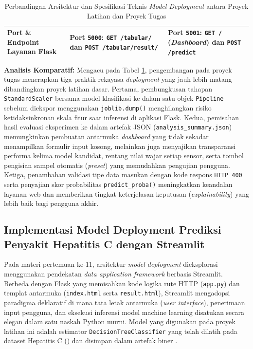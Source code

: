 \documentclass[a4paper,oneside,11pt]{book}
\begin{document}
\begin{table}[H]
{\begin{tabular}{|l|p{6.2cm}|p{6.5cm}|}
      Port \& Endpoint Layanan Flask & Port \texttt{5000}: \texttt{GET /tabular/} dan \texttt{POST /tabular/result/} & Port \texttt{5001}: \texttt{GET /} (\textit{Dashboard}) dan \texttt{POST /predict} \\ \hline
    \end{tabular}%
  }
  \caption{Perbandingan Arsitektur dan Spesifikasi Teknis \textit{Model Deployment} antara Proyek Latihan dan Proyek Tugas}
  \label{tab:komparasi-deployment}
\end{table}

\par \textbf{Analisis Komparatif:} Mengacu pada Tabel \ref{tab:komparasi-deployment}, pengembangan pada proyek tugas menerapkan tiga praktik rekayasa \textit{deployment} yang jauh lebih matang dibandingkan proyek latihan dasar. Pertama, pembungkusan tahapan \texttt{StandardScaler} bersama model klasifikasi ke dalam satu objek \texttt{Pipeline} sebelum diekspor menggunakan \texttt{joblib.dump()} menghilangkan risiko ketidaksinkronan skala fitur saat inferensi di aplikasi Flask. Kedua, pemisahan hasil evaluasi eksperimen ke dalam artefak JSON (\texttt{analysis\_summary.json}) memungkinkan pembuatan antarmuka \textit{dashboard} yang tidak sekadar menampilkan formulir input kosong, melainkan juga menyajikan transparansi performa kelima model kandidat, rentang nilai wajar setiap sensor, serta tombol pengisian sampel otomatis (\textit{preset}) yang memudahkan pengujian pengguna. Ketiga, penambahan validasi tipe data masukan dengan kode respons \texttt{HTTP 400} serta penyajian skor probabilitas \texttt{predict\_proba()} meningkatkan keandalan layanan web dan memberikan tingkat keterjelasan keputusan (\textit{explainability}) yang lebih baik bagi pengguna akhir.

\subsection{Implementasi Model Deployment Prediksi Penyakit Hepatitis C dengan Streamlit}

\par Pada materi pertemuan ke-11, arsitektur \textit{model deployment} dieksplorasi menggunakan pendekatan \textit{data application framework} berbasis Streamlit. Berbeda dengan Flask yang memisahkan kode logika rute HTTP (\texttt{app.py}) dan templat antarmuka (\texttt{index.html} serta \texttt{result.html}), Streamlit mengadopsi paradigma deklaratif di mana tata letak antarmuka (\textit{user interface}), penerimaan input pengguna, dan eksekusi inferensi model machine learning disatukan secara elegan dalam satu naskah Python murni. Model yang digunakan pada proyek latihan ini adalah estimator \texttt{DecisionTreeClassifier} yang telah dilatih pada dataset Hepatitis C () dan disimpan dalam artefak biner .
\end{document}
